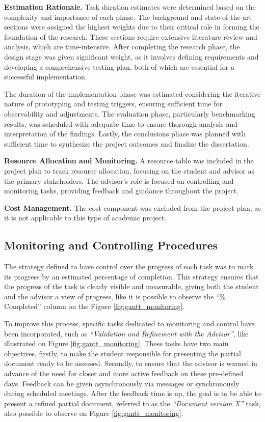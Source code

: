 
\textbf{Estimation Rationale.} Task duration estimates were determined based on the complexity and importance of each phase. The background and state-of-the-art sections were assigned the highest weights due to their critical role in forming the foundation of the research. These sections require extensive literature review and analysis, which are time-intensive. After completing the research phase, the design stage was given significant weight, as it involves defining requirements and developing a comprehensive testing plan, both of which are essential for a successful implementation.

The duration of the implementation phase was estimated considering the iterative nature of prototyping and testing triggers, ensuring sufficient time for observability and adjustments. The evaluation phase, particularly benchmarking results, was scheduled with adequate time to ensure thorough analysis and interpretation of the findings. Lastly, the conclusions phase was planned with sufficient time to synthesize the project outcomes and finalize the dissertation.

\textbf{Resource Allocation and Monitoring.} A resource table was included in the project plan to track resource allocation, focusing on the student and advisor as the primary stakeholders. The advisor’s role is focused on controlling and monitoring tasks, providing feedback and guidance throughout the project.

\textbf{Cost Management.} The cost component was excluded from the project plan, as it is not applicable to this type of academic project.

\subsection{Monitoring and Controlling Procedures}

The strategy defined to have control over the progress of each task was to mark its progress by an estimated percentage of completion. This strategy ensures that the progress of the task is clearly visible and measurable, giving both the student and the advisor a view of progress, like it is possible to observe the “\% Completed” column on the Figure \ref{fig:gantt_monitoring}.

To improve this process, specific tasks dedicated to monitoring and control have been incorporated, such as \textit{“Validation and Refinement with the Advisor”}, like illustrated on Figure \ref{fig:gantt_monitoring}. These tasks have two main objectives, firstly, to make the student responsible for presenting the partial document ready to be assessed. Secondly, to ensure that the advisor is warned in advance of the need for closer and more active feedback on these pre-defined days. Feedback can be given asynchronously via messages or synchronously during scheduled meetings. After the feedback time is up, the goal is to be able to present a refined partial document, referred to as the \textit{“Document version X”} task, also possible to observe on Figure \ref{fig:gantt_monitoring}.

